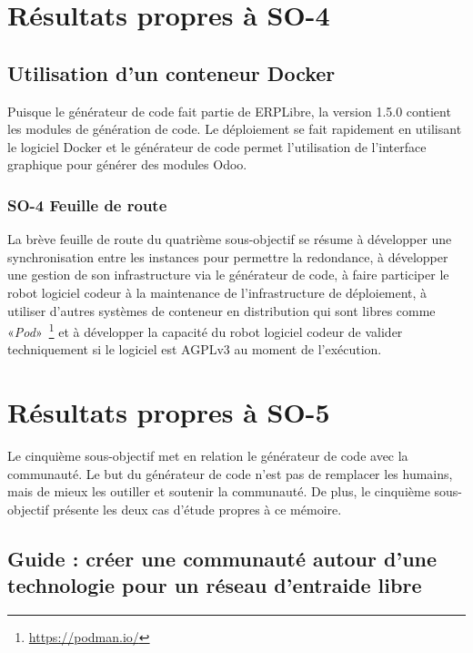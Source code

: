\section{Résultats propres à SO-4}

\subsection{Utilisation d’un conteneur Docker}

Puisque le générateur de code fait partie de ERPLibre, la version 1.5.0 contient les modules de génération de code. Le déploiement se fait rapidement en utilisant le logiciel Docker et le générateur de code permet l’utilisation de l’interface graphique pour générer des modules Odoo.

\subsubsection{SO-4 Feuille de route}
La brève feuille de route du quatrième sous-objectif se résume à développer une synchronisation entre les instances pour permettre la redondance, à développer une gestion de son infrastructure via le générateur de code, à faire participer le robot logiciel codeur à la maintenance de l’infrastructure de déploiement, à utiliser d’autres systèmes de conteneur en distribution qui sont libres comme «\textit{Pod}»~\footnote{\url{https://podman.io/}} et à développer la capacité du robot logiciel codeur de valider techniquement si le logiciel est AGPLv3 au moment de l’exécution.

\section{Résultats propres à SO-5}
Le cinquième sous-objectif met en relation le générateur de code avec la communauté. Le but du générateur de code n'est pas de remplacer les humains, mais de mieux les outiller et soutenir la communauté. De plus, le cinquième sous-objectif présente les deux cas d'étude propres à ce mémoire.
\subsection{Guide : créer une communauté autour d’une technologie pour un réseau d’entraide libre}


